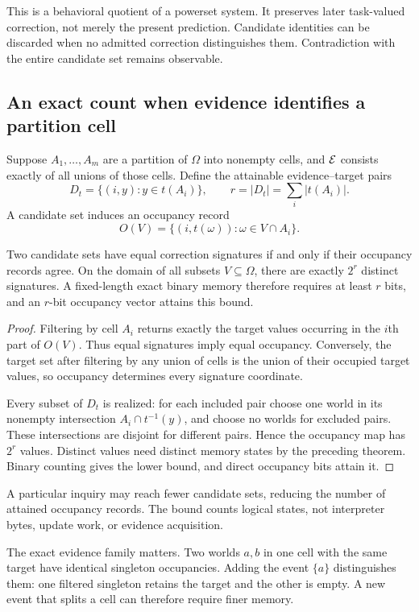 This is a behavioral quotient of a powerset system. It preserves later task-valued correction, not merely the present prediction. Candidate identities can be discarded when no admitted correction distinguishes them. Contradiction with the entire candidate set remains observable.

\subsection{An exact count when evidence identifies a partition cell}
Suppose $A_1,\ldots,A_m$ are a partition of $\Omega$ into nonempty cells, and $\mathcal E$ consists exactly of all unions of those cells. Define the attainable evidence--target pairs
\[
D_t=\{(i,y): y\in t(A_i)\},\qquad r=|D_t|=\sum_i|t(A_i)|.
\]
A candidate set induces an occupancy record
\[
O(V)=\{(i,t(\omega)):\omega\in V\cap A_i\}.
\]

\begin{GAcorollary}\label{GA:cor:occupancy}
Two candidate sets have equal correction signatures if and only if their occupancy records agree. On the domain of all subsets $V\subseteq\Omega$, there are exactly $2^r$ distinct signatures. A fixed-length exact binary memory therefore requires at least $r$ bits, and an $r$-bit occupancy vector attains this bound.
\end{GAcorollary}
\begin{proof}
Filtering by cell $A_i$ returns exactly the target values occurring in the $i$th part of $O(V)$. Thus equal signatures imply equal occupancy. Conversely, the target set after filtering by any union of cells is the union of their occupied target values, so occupancy determines every signature coordinate.

Every subset of $D_t$ is realized: for each included pair choose one world in its nonempty intersection $A_i\cap t^{-1}(y)$, and choose no worlds for excluded pairs. These intersections are disjoint for different pairs. Hence the occupancy map has $2^r$ values. Distinct values need distinct memory states by the preceding theorem. Binary counting gives the lower bound, and direct occupancy bits attain it.
\end{proof}

A particular inquiry may reach fewer candidate sets, reducing the number of attained occupancy records. The bound counts logical states, not interpreter bytes, update work, or evidence acquisition.

The exact evidence family matters. Two worlds $a,b$ in one cell with the same target have identical singleton occupancies. Adding the event $\{a\}$ distinguishes them: one filtered singleton retains the target and the other is empty. A new event that splits a cell can therefore require finer memory.

